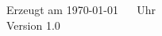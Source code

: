 \documentclass[ a4paper, 
				13pt,
				headsepline, 
				footsepline, 
				openany %
]{scrbook}
\begin{document}
\parindent 0pt

\pagestyle{plain}


\hfill \par
\vfill
\small
Erzeugt am \today~ \currenttime~ Uhr \\
Version 1.0 \\
\currfileabspath

\newpage
\thispagestyle{empty}
\tableofcontents


\pagestyle{scrheadings}











\end{document}
